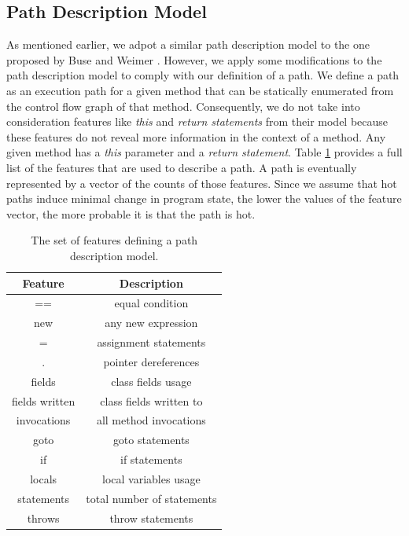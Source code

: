 \documentclass[10pt,twocolumn,letterpaper]{article}
\begin{document}
\subsection{Path Description Model}
As mentioned earlier, we adpot a similar path description model to the one proposed by Buse and Weimer \cite{buse2009road}. However, we apply some modifications
to the path description model to comply with our definition of a path. We define a path as an execution path for a given method that can be statically
enumerated from the control flow graph of that method. Consequently, we do not take into consideration features like \textit{this} and \textit{return
statements} from their model \cite{buse2009road} because these features do not reveal more information in the context of a method. Any given method has a
\textit{this} parameter and a \textit{return statement}. Table \ref{tab:features} provides a full list of the features that are used to describe a path. A
path is eventually represented by a vector of the counts of those features. Since we assume that hot paths induce minimal change in program state, the lower the
values of the feature vector, the more probable it is that the path is hot.

\begin{table}[h!]
\centering
\begin{tabular}{|c|c|}
\hline
\textbf{Feature} & \textbf{Description}\\
\hline\hline
== & equal condition \\
\hline
new & any new expression \\
\hline
= & assignment statements \\
\hline
. & pointer dereferences \\
\hline
fields & class fields usage  \\
\hline
fields written & class fields written to \\
\hline
invocations & all method invocations \\
\hline
goto & goto statements \\
\hline
if & if statements \\
\hline
locals & local variables usage \\
\hline
statements & total number of statements \\
\hline
throws & throw statements \\
\hline
\end{tabular}
\centering
\caption{The set of features defining a path description model.}
\label{tab:features}
\end{table}
\end{document}
